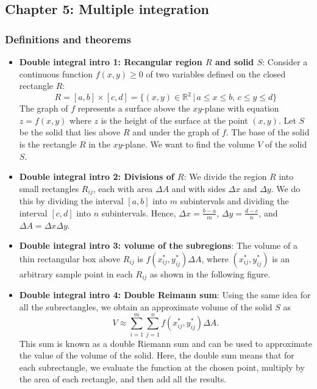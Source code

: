 \documentclass{report}
\begin{document}
    \pagebreak 
    \subsection{Chapter 5: Multiple integration}
    \bigbreak \noindent 
    \subsubsection{Definitions and theorems}
    \begin{itemize}
        \item \textbf{Double integral intro 1: Recangular region $R$ and solid $S$}:
            Consider a continuous function $f(x,y) \geq 0$ of two variables defined on the closed rectangle $R$:
            \[
                R = [a,b] \times [c,d] = \{(x,y) \in \mathbb{R}^2 \,|\, a \leq x \leq b, \, c \leq y \leq d\}
            \]
            \bigbreak \noindent 
            The graph of $f$ represents a surface above the $xy$-plane with equation $z = f(x,y)$ where $z$ is the height of the surface at the point $(x,y)$. Let $S$ be the solid that lies above $R$ and under the graph of $f$. The base of the solid is the rectangle $R$ in the $xy$-plane. We want to find the volume $V$ of the solid $S$.
            \bigbreak \noindent 
        \item \textbf{Double integral intro 2: Divisions of $R$}:
            We divide the region $R$ into small rectangles $R_{ij}$, each with area $\Delta A$ and with sides $\Delta x$ and $\Delta y$. We do this by dividing the interval $[a,b]$ into $m$ subintervals and dividing the interval $[c,d]$ into $n$ subintervals. Hence, $\Delta x = \frac{b-a}{m}$, $\Delta y = \frac{d-c}{n}$, and $\Delta A = \Delta x \Delta y$.
            \bigbreak \noindent 
        \item \textbf{Double integral intro 3: volume of the subregions}:
            The volume of a thin rectangular box above $R_{ij}$ is $f(x^*_{ij}, y^*_{ij})\Delta A$, where $(x^*_{ij}, y^*_{ij})$ is an arbitrary sample point in each $R_{ij}$ as shown in the following figure.
            \bigbreak \noindent 
        \item \textbf{Double integral intro 4: Double Reimann sum}:
            Using the same idea for all the subrectangles, we obtain an approximate volume of the solid $S$ as 
            \[ V \approx \sum_{i=1}^{m}\sum_{j=1}^{n} f(x^*_{ij}, y^*_{ij})\Delta A. \]
            This sum is known as a double Riemann sum and can be used to approximate the value of the volume of the solid. Here, the double sum means that for each subrectangle, we evaluate the function at the chosen point, multiply by the area of each rectangle, and then add all the results.

\end{itemize}
\end{document}
